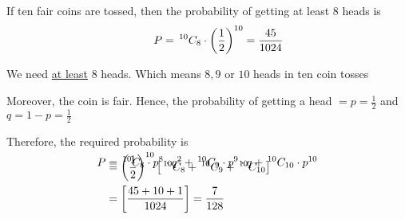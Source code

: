 \documentclass[14pt,fleqn]{extarticle}
\begin{document}
 
\begin{snippet}
    
    \incorrect
    
    If ten fair coins are tossed, then the probability of getting 
    at least $8$ heads is 
    \[ \qquad P = \,^{10}C_{8}\cdot \left(\frac{1}{2} \right)^{10} = \frac{45}{1024}\]
    \reason
    
    We need \underline{at least} $8$ heads. Which means $8,9$ or $10$ heads in ten coin tosses \newline 

    Moreover, the coin is fair. Hence, the probability of getting a head $=p=\frac{1}{2}$ and $q = 1-p = \frac{1}{2}$ \newline 
        
    Therefore, the required probability is 
    \begin{align}
	P &= \,^{10}C_{8}\cdot p^8\cdot q^2 + \,^{10}C_{9}\cdot p^9\cdot q + \,^{10}C_{10}\cdot p^{10} \\[-20pt]
	&= \left(\frac{1}{2} \right)^{10} \left[\,^{10}C_{8} + \,^{10}C_{9} + \,^{10}C_{10} \right] \\
	&= \left[ \frac{45+10+1}{1024}\right] = \frac{7}{128}
\end{align}
\end{snippet} 
\end{document}
